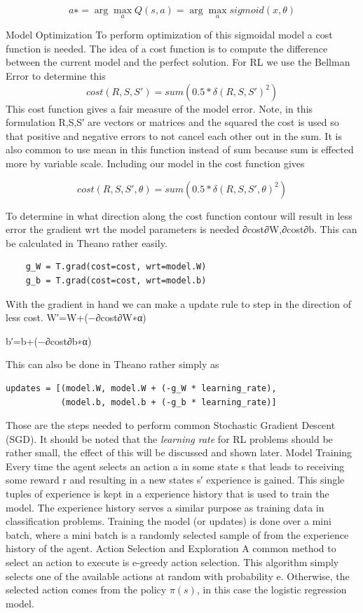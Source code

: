 \[a∗= \arg\max_{a}Q(s,a)=\arg\max_{a} sigmoid(x,\theta)\]


Model Optimization 
To perform optimization of this sigmoidal model a cost function is needed. The idea of a cost function is to compute the difference between the current model and the perfect solution. For RL we use the Bellman Error to determine this
\[cost(R, S, S') = sum(0.5 * \delta(R, S, S')^{2})\]
This cost function gives a fair measure of the model error. Note, in this formulation R,S,S′ are vectors or matrices and the squared the cost is used so that positive and negative errors to not cancel each other out in the sum. It is also common to use mean in this function instead of sum because sum is effected more by variable scale. Including our model in the cost function gives

\[cost(R, S, S', \theta) = sum(0.5 * \delta(R, S, S', \theta)^{2})\]

To determine in what direction along the cost function contour will result in less error the gradient wrt the model parameters is needed 
∂cost∂W,∂cost∂b. This can be calculated in Theano rather easily.

\begin{lstlisting}
    g_W = T.grad(cost=cost, wrt=model.W)
    g_b = T.grad(cost=cost, wrt=model.b)
\end{lstlisting}

With the gradient in hand we can make a update rule to step in the direction of less cost. 
W′=W+(−∂cost∂W∗α)

b′=b+(−∂cost∂b∗α)

This can also be done in Theano rather simply as 

\begin{lstlisting}
updates = [(model.W, model.W + (-g_W * learning_rate),
           (model.b, model.b + (-g_b * learning_rate)]
\end{lstlisting}


Those are the steps needed to perform common Stochastic Gradient Descent (SGD). It should be noted that the \textit{learning rate} \learningRate for RL problems should be rather small, the effect of this will be discussed and shown later.
Model Training
Every time the agent selects an action a in some state s that leads to receiving some reward r and resulting in a new states s′ experience is gained. This single tuples of experience is kept in a experience history that is used to train the model. The experience history serves a similar purpose as training data in classification problems. 
Training the model (or updates) is done over a mini batch, where a mini batch is a randomly selected sample of from the experience history of the agent. 
Action Selection and Exploration
A common method to select an action to execute is e-greedy action selection. This algorithm simply selects one of the available actions at random with probability e. Otherwise, the selected action comes from the policy \(\pi(s)\), in this case the logistic regression model.

